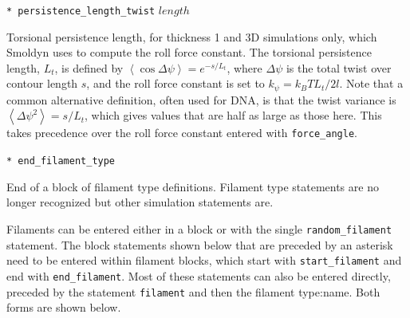 \documentclass {scrbook}
\newcommand {\ttt} {\texttt}
\begin{document}
\begin{description}
\item{\ttt{* persistence\_length\_twist} $length$}%

Torsional persistence length, for thickness 1 and 3D simulations only, which Smoldyn uses to compute the roll force constant. The torsional persistence length, $L_t$, is defined by $\left< \cos \Delta \psi \right> = e^{-s/L_t}$, where $\Delta \psi$ is the total twist over contour length $s$, and the roll force constant is set to $k_\psi=k_BT L_t/2l$. Note that a common alternative definition, often used for DNA, is that the twist variance is $\left< \Delta\psi^2 \right> = s/L_t$, which gives values that are half as large as those here. This takes precedence over the roll force constant entered with \ttt{force\_angle}.

\item{\ttt{* end\_filament\_type}}

End of a block of filament type definitions. Filament type statements are no longer recognized but other simulation statements are.

\end{description}

Filaments can be entered either in a block or with the single \ttt{random\_filament} statement. The block statements shown below that are preceded by an asterisk need to be entered within filament blocks, which start with \ttt{start\_filament} and end with \ttt{end\_filament}. Most of these statements can also be entered directly, preceded by the statement \ttt{filament} and then the filament type:name. Both forms are shown below.
\end{document}
